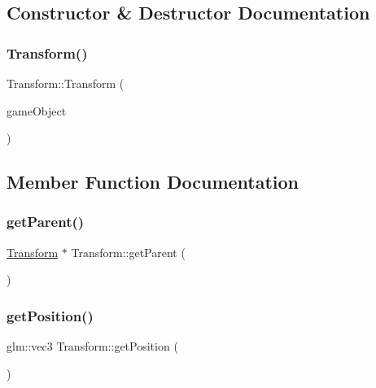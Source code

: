 \subsection{Constructor \& Destructor Documentation}
\hypertarget{class_mason_1_1_transform_a00209266b27fa0c297551a0ce4a07017}{}\label{class_mason_1_1_transform_a00209266b27fa0c297551a0ce4a07017} 
\subsubsection{\texorpdfstring{Transform()}{Transform()}}
{\footnotesize\ttfamily Transform\+::\+Transform (\begin{DoxyParamCaption}\item[{\hyperlink{class_mason_1_1_game_object}{Game\+Object} $\ast$}]{game\+Object }\end{DoxyParamCaption})\hspace{0.3cm}{\ttfamily [protected]}}



\subsection{Member Function Documentation}
\hypertarget{class_mason_1_1_transform_ae3e8acbd25d7d171aff00da038f79a9a}{}\label{class_mason_1_1_transform_ae3e8acbd25d7d171aff00da038f79a9a} 
\subsubsection{\texorpdfstring{get\+Parent()}{getParent()}}
{\footnotesize\ttfamily \hyperlink{class_mason_1_1_transform}{Transform} $\ast$ Transform\+::get\+Parent (\begin{DoxyParamCaption}{ }\end{DoxyParamCaption})\hspace{0.3cm}{\ttfamily [virtual]}}

\hypertarget{class_mason_1_1_transform_a0b21f641e72d7b55f3a630b986d0b106}{}\label{class_mason_1_1_transform_a0b21f641e72d7b55f3a630b986d0b106} 
\subsubsection{\texorpdfstring{get\+Position()}{getPosition()}}
{\footnotesize\ttfamily glm\+::vec3 Transform\+::get\+Position (\begin{DoxyParamCaption}{ }\end{DoxyParamCaption})\hspace{0.3cm}{\ttfamily [virtual]}}



